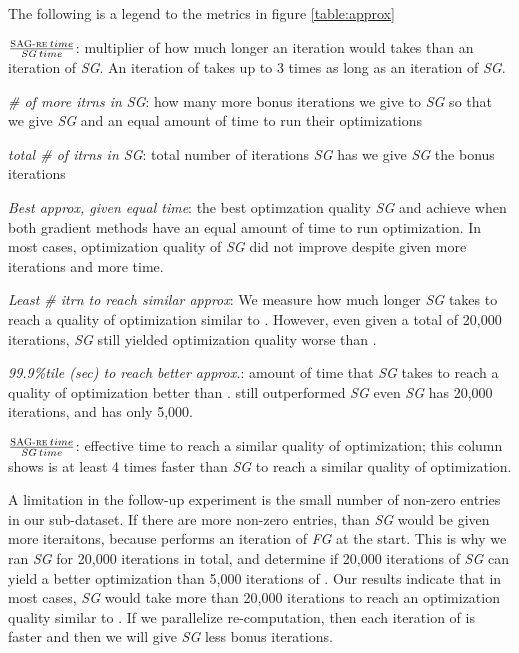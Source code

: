 The following is a legend to the metrics in figure \ref{table:approx}
\begin{sloppy}
\begin{compactenum}
\item $\frac{\textsc{SAG-re}\:time}{\emph{SG}\:time}$: 
multiplier of how much longer an iteration would \tool takes than an iteration of \emph{SG}.  
An iteration of \tool takes up to 3 times as long as an iteration of \emph{SG}.
\item \emph{\# of more itrns in SG}: 
how many more bonus iterations we give to \emph{SG} so that we give \emph{SG} and \tool an equal amount of time to run their optimizations
\item \emph{total \# of itrns in SG}: 
total number of iterations \emph{SG} has we give \emph{SG} the bonus iterations
\item \emph{Best approx, given equal time}:
the best optimzation quality \emph{SG} and \tool achieve when both gradient methods have an equal amount of time to run optimization.
In most cases, optimization quality of \emph{SG} did not improve despite given more iterations and more time.
\item \emph{Least \# itrn to reach similar approx}:
We measure how much longer \emph{SG} takes to reach a quality of optimization similar to \tool.
However, even given a total of 20,000 iterations, \emph{SG} still yielded optimization quality worse than \tool.
\item \emph{99.9\%tile (sec) to reach better approx.}:
amount of time that \emph{SG} takes to reach a quality of optimization better than \tool.
\tool still outperformed \emph{SG} even \emph{SG} has 20,000 iterations, and \tool has only 5,000.
\item $\frac{\textsc{SAG-re}\:time}{\emph{SG}\:time}$: effective time to reach a similar quality of optimization;
this column shows \tool is at least 4 times faster than \emph{SG} to reach a similar quality of optimization.
\end{compactenum}
\end{sloppy}

A limitation in the follow-up experiment is the small number of non-zero entries in our sub-dataset.  
If there are more non-zero entries, than \emph{SG} would be given more iteraitons, because \tool performs an iteration of \emph{FG} at the start.
This is why we ran \emph{SG} for 20,000 iterations in total, and determine if 20,000 iterations of \emph{SG} can yield a better optimization than 5,000 iterations of \tool.
Our results indicate that in most cases, \emph{SG} would take more than 20,000 iterations to reach an optimization quality similar to \tool.
If we parallelize re-computation, then each iteration of \tool is faster and then we will give \emph{SG} less bonus iterations.  



